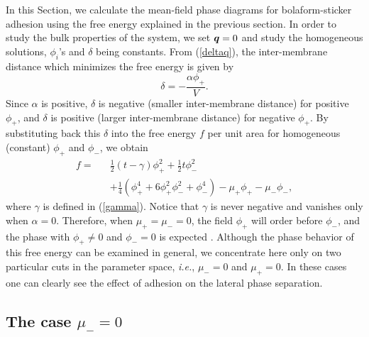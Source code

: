 In this Section, we calculate the mean-field phase diagrams for
bolaform-sticker adhesion using the free energy explained in the
previous section. In order to study the bulk properties of the
system, we set $\mbox{\boldmath $q$}=0$ and study the homogeneous
solutions, $\phi_i$'s and $\delta$ being constants. From
(\ref{deltaq}), the inter-membrane distance which minimizes the
free energy is given by
\begin{equation}
\delta = - \frac{\alpha \phi_+}{V}.
\label{deltasym}
\end{equation}
Since $\alpha$ is positive, $\delta$ is negative (smaller
inter-membrane distance) for positive $\phi_+$, and $\delta$ is
positive (larger inter-membrane distance) for negative $\phi_+$.
By substituting back this $\delta$ into the free energy
$f$ per unit area for homogeneous (constant) $\phi_+$ and $\phi_-$,
we obtain
\begin{eqnarray}
f = & & \frac{1}{2} \left(t - \gamma \right) \phi_+^2
+ \frac{1}{2} t \phi_-^2
\nonumber  \\
& & + \frac{1}{4} (\phi_+^4 + 6 \phi_+^2 \phi_-^2 + \phi_-^4)
-\mu_+ \phi_+ -\mu_- \phi_-,
\label{fslocal2}
\end{eqnarray}
where $\gamma$ is defined in (\ref{gamma}).
Notice that $\gamma$ is never negative and vanishes only when $\alpha=0$.
Therefore, when $\mu_+=\mu_-=0$, the field $\phi_+$ will order before
$\phi_-$, and the phase with $\phi_+ \neq 0$ and $\phi_- = 0$ is
expected \cite{CL}.
Although the phase behavior of this free energy
can be examined in general, we concentrate here only on two particular
cuts
in the parameter space, {\it i.e.}, $\mu_- = 0$ and $\mu_+ = 0$.
In these cases one can clearly see the effect of adhesion on the lateral
phase separation.


\subsection{The case $\mu_-=0$}


